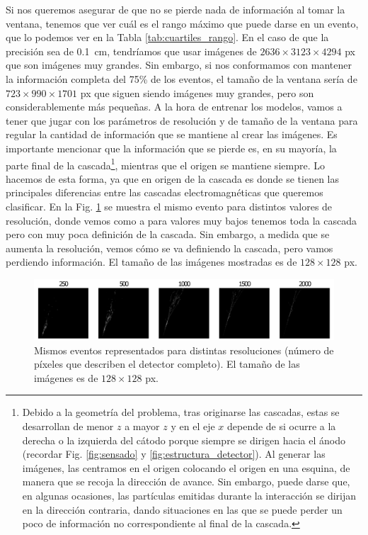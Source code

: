 \documentclass[a4paper,12pt,oneside,titlepage]{book}
\begin{document}
Si nos queremos asegurar de que no se pierde nada de información al tomar la ventana, tenemos que ver cuál es el rango máximo que puede darse en un evento, que lo podemos ver en la Tabla \ref{tab:cuartiles_rango}. En el caso de que la precisión sea de \SI{0.1}{\cm}, tendríamos que usar imágenes de $2636\times 3123\times 4294$ \si{px} que son imágenes muy grandes. Sin embargo, si nos conformamos con mantener la información completa del 75\% de los eventos, el tamaño de la ventana sería de $723\times 990\times 1701$ \si{px} que siguen siendo imágenes muy grandes, pero son considerablemente más pequeñas. A la hora de entrenar los modelos, vamos a tener que jugar con los parámetros de resolución y de tamaño de la ventana para regular la cantidad de información que se mantiene al crear las imágenes. Es importante mencionar que la información que se pierde es, en su mayoría, la parte final de la cascada\footnote{Debido a la geometría del problema, tras originarse las cascadas, estas se desarrollan de menor $z$ a mayor $z$ y en el eje $x$ depende de si ocurre a la derecha o la izquierda del cátodo porque siempre se dirigen hacia el ánodo (recordar Fig. \ref{fig:sensado} y \ref{fig:estructura_detector}). Al generar las imágenes, las centramos en el origen colocando el origen en una esquina, de manera que se recoja la dirección de avance. Sin embargo, puede darse que, en algunas ocasiones, las partículas emitidas durante la interacción se dirijan en la dirección contraria, dando situaciones en las que se puede perder un poco de información no correspondiente al final de la cascada.}, mientras que el origen se mantiene siempre. Lo hacemos de esta forma, ya que en origen de la cascada es donde se tienen las principales diferencias entre las cascadas electromagnéticas que queremos clasificar. En la Fig. \ref{fig:varias_resoluciones} se muestra el mismo evento para distintos valores de resolución, donde vemos como a para valores muy bajos tenemos toda la cascada pero con muy poca definición de la cascada. Sin embargo, a medida que se aumenta la resolución, vemos cómo se va definiendo la cascada, pero vamos perdiendo información. El tamaño de las imágenes mostradas es de $128\times128$ px.

\begin{figure}[h!]
  \centering
  \includegraphics[scale=0.65, center]{varias_resoluciones.pdf}
  \caption{Mismos eventos representados para distintas resoluciones (número de píxeles que describen el detector completo). El tamaño de las imágenes es de $128\times128$ px.}
  \label{fig:varias_resoluciones}
\end{figure}
\end{document}
